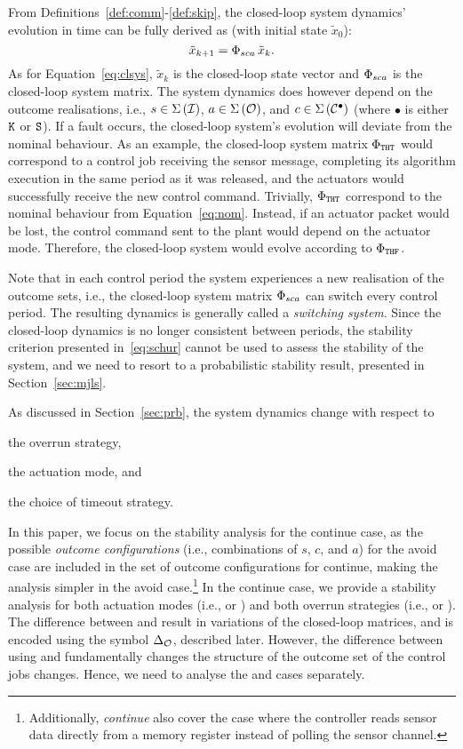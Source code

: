 From Definitions~\ref{def:comm}-\ref{def:skip}, the closed-loop system dynamics' evolution in time can be fully derived as (with initial state $\tilde{x}_0$):
%
\begin{equation}
    \label{eq:cl-dynamics} 
    \tilde x_{k+1} = \clmat_{sca}\, \tilde x_k.
\end{equation}
%
As for Equation~\eqref{eq:clsys}, $\tilde x_k$ is the closed-loop state vector and $\Phi_{sca}$ is the closed-loop system matrix.
The system dynamics does however depend on the outcome realisations, i.e., $s \in \Sigma\left( \mathcal{I} \right)$, $a \in \Sigma\left( \mathcal{O} \right)$, and $c \in \Sigma\,({\mathcal{C}^{\bullet}})$ (where $\bullet$ is either $\texttt{K}$ or $\texttt{S}$).
If a fault occurs, the closed-loop system's evolution will deviate from the nominal behaviour.
As an example, the closed-loop system matrix $\Phi_{\texttt{T}\texttt{H}\texttt{T}}$ would correspond to a control job receiving the sensor message, completing its algorithm execution in the same period as it was released, and the actuators would successfully receive the new control command.
Trivially, $\Phi_{\texttt{T}\texttt{H}\texttt{T}}$ correspond to the nominal behaviour from Equation~\eqref{eq:nom}.
Instead, if an actuator packet would be lost, the control command sent to the plant would depend on the actuator mode.
Therefore, the closed-loop system would evolve according to $\Phi_{\texttt{T}\texttt{H}\texttt{F}}$.

Note that in each control period the system experiences a new realisation of the outcome sets, i.e., the closed-loop system matrix $\Phi_{sca}$ can switch every control period.
The resulting dynamics is generally called a \emph{switching system}.
Since the closed-loop dynamics is no longer consistent between periods, the stability criterion presented in~\eqref{eq:schur} cannot be used to assess the stability of the system, and we need to resort to a probabilistic stability result, presented in Section~\ref{sec:mjls}.

As discussed in Section~\ref{sec:prb}, the system dynamics change with respect to
\begin{enumerate*}[label=(\roman*)]
    \item the overrun strategy,
    \item the actuation mode, and
    \item the choice of timeout strategy.
\end{enumerate*}
In this paper, we focus on the stability analysis for the continue case, as the possible \emph{outcome configurations} (i.e., combinations of $s$, $c$, and $a$) for the avoid case are included in the set of outcome configurations for continue, making the analysis simpler in the avoid case.\footnote{Additionally, \emph{continue} also cover the case where the controller reads sensor data directly from a memory register instead of polling the sensor channel.}
In the continue case, we provide a stability analysis for both actuation modes (i.e., \tZ{} or \tH{}) and both overrun strategies (i.e., \tK{} or \tS{}).
The difference between \tZ{} and \tH{} result in variations of the closed-loop matrices, and is encoded using the symbol $\Delta_{\mathcal{O}}$, described later.
However, the difference between using \tK{} and \tS{} fundamentally changes the structure of the outcome set of the control jobs changes.
Hence, we need to analyse the \tK{} and \tS{} cases separately.

